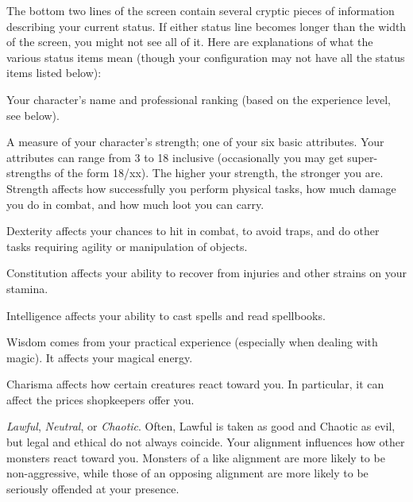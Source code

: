 
The bottom two lines of the screen contain several cryptic pieces of
information describing your current status.  If either status line
becomes longer than the width of the screen, you might not see all of
it.  Here are explanations of what the various status items mean
(though your configuration may not have all the status items listed
below):
\blist{}

\item[\bb{Rank}]
Your character's name and professional ranking (based on the
experience level, see below).

\item[\bb{Strength}]
A measure of your character's strength; one of your six basic
attributes.  Your attributes can range from 3 to 18 inclusive
(occasionally you may get super-strengths of the form 18/xx).  The
higher your strength, the stronger you are.  Strength affects how
successfully you perform physical tasks, how much damage you do in
combat, and how much loot you can carry.

\item[\bb{Dexterity}]
Dexterity affects your chances to hit in combat, to avoid traps, and
do other tasks requiring agility or manipulation of objects.

\item[\bb{Constitution}]
Constitution affects your ability to recover from injuries and other
strains on your stamina.

\item[\bb{Intelligence}]
Intelligence affects your ability to cast spells and read spellbooks.

\item[\bb{Wisdom}]
Wisdom comes from your practical experience (especially when dealing with
magic).  It affects your magical energy.

\item[\bb{Charisma}]
Charisma affects how certain creatures react toward you.  In
particular, it can affect the prices shopkeepers offer you.

\item[\bb{Alignment}]
{\it Lawful}, {\it Neutral}, or {\it Chaotic}.  Often, Lawful is
taken as good and Chaotic as evil, but legal and ethical do not always
coincide.  Your alignment influences how other
monsters react toward you.  Monsters of a like alignment are more likely
to be non-aggressive, while those of an opposing alignment are more likely
to be seriously offended at your presence.

